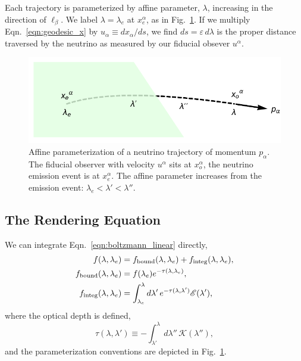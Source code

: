 \documentclass[aps,floatfix,prd,superscriptaddress,twocolumn]{revtex4-1}
\newcommand{\todo}[1]{\marginpar{\tiny{\textcolor{red}{#1}}}}
\begin{document}
Each trajectory is parameterized by affine parameter, $\lambda$, increasing in
the direction of $\ell_\beta$. We label $\lambda=\lambda_e$ at $x^\alpha_e$,
as in Fig.~\ref{fig:affine_param}.
If we multiply Eqn.~\ref{eqn:geodesic_x} by $u_\alpha \equiv dx_\alpha/ds$,
we find $ds=\varepsilon \,d\lambda$ is the proper distance traversed by the
neutrino as measured by our fiducial obsever $u^\alpha$.

\begin{figure}
  \includegraphics[width=\columnwidth]{fig-affine_parameter_label}
  \caption{Affine parameterization of a neutrino trajectory of momentum
    $p_\alpha$.
    The fiducial observer with velocity $u^\alpha$ sits at $x^\alpha_o$,
    the neutrino emission event is at $x^\alpha_e$. The affine parameter
    increases from the emission event: $\lambda_e<\lambda'<\lambda''$.}
  \label{fig:affine_param}
\end{figure}

\subsection{The Rendering Equation}
\label{ssec:rendering_eqn}
We can integrate Eqn.~\ref{eqn:boltzmann_linear} directly,
\begin{align}
  \label{eqn:rendering}
  f(\lambda,\lambda_e) &=
  f_{\rm bound}(\lambda,\lambda_e) + f_{\rm integ}(\lambda,\lambda_e), \\
  \label{eqn:rendering_fbound}
  f_{\rm bound}(\lambda,\lambda_e) &=
  f(\lambda_e) e^{-\tau(\lambda,\lambda_e)}, \\
  \label{eqn:rendering_finteg}
  f_{\rm integ}(\lambda,\lambda_e) &=
  \int_{\lambda_e}^\lambda d\lambda'\,e^{-\tau(\lambda,\lambda')}
  \mathscr{E}(\lambda'),
\end{align}
where the optical depth is defined,
\todo{rewrite this section simpler; don't give integral solution
  since we don't use}
\begin{equation}
  \label{eqn:optical_depth}
  \tau(\lambda,\lambda') \equiv -\int_{\lambda'}^\lambda
  d\lambda'' \, \mathscr{K}(\lambda''),
\end{equation}
and the parameterization conventions are depicted in
Fig.~\ref{fig:affine_param}.
\end{document}
